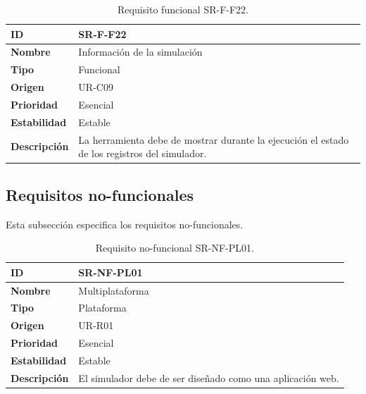 \begin{center}
\begin{table}[htbp]
\centering
\caption{Requisito funcional SR-F-F22.}
\begin{tabular}{@{}p{2.5cm} p{9cm}@{}} 
\toprule
\textbf{ID} 				& SR-F-F22\\
\midrule
\textbf{Nombre} 			& Información de la simulación\\
\midrule
\textbf{Tipo} 			& Funcional \\
\midrule
\textbf{Origen} 			& UR-C09 \\
\midrule
\textbf{Prioridad}		& Esencial \\
\midrule
\textbf{Estabilidad} 		& Estable \\
\midrule
\textbf{Descripción} 	& La herramienta debe de mostrar durante la ejecución el estado de los registros del simulador. \\
\bottomrule
\end{tabular}
\label{tab:srff22}
\end{table}
\end{center}

\subsection{Requisitos no-funcionales}

Esta subsección especifica los requisitos no-funcionales.

\begin{center}
\begin{table}[htbp]
\centering
\caption{Requisito no-funcional SR-NF-PL01.}
\begin{tabular}{@{}p{2.5cm} p{9cm}@{}} 
\toprule
\textbf{ID} 				& SR-NF-PL01 \\
\midrule
\textbf{Nombre} 			&  Multiplataforma \\
\midrule
\textbf{Tipo} 			& Plataforma \\
\midrule
\textbf{Origen} 			& UR-R01 \\
\midrule
\textbf{Prioridad}		& Esencial \\
\midrule
\textbf{Estabilidad} 		& Estable \\
\midrule
\textbf{Descripción} 	& El simulador debe de ser diseñado como una aplicación web. \\
\bottomrule
\end{tabular}
\label{tab:srnfpl01}
\end{table}
\end{center}


